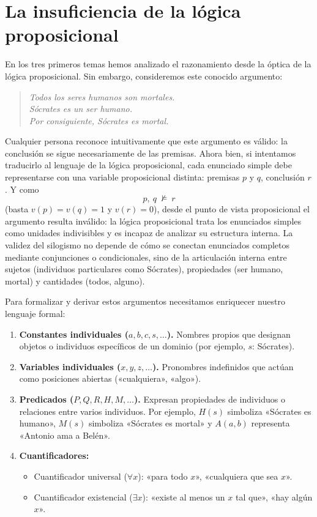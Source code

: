 \section{La insuficiencia de la lógica proposicional}

En los tres primeros temas hemos analizado el razonamiento desde la óptica de la lógica proposicional. Sin embargo, consideremos este conocido argumento:
\begin{quote}
\textit{Todos los seres humanos son mortales.}\\
\textit{Sócrates es un ser humano.}\\
\textit{Por consiguiente, Sócrates es mortal.}
\end{quote}
Cualquier persona reconoce intuitivamente que este argumento es válido: la conclusión se sigue necesariamente de las premisas. Ahora bien, si intentamos traducirlo al lenguaje de la lógica proposicional, cada enunciado simple debe representarse con una variable proposicional distinta: premisas $p$ y $q$, conclusión $r$. Y como
\[
p, \ q \ \not\models \ r
\]
(basta $v(p) = v(q) = 1$ y $v(r) = 0$), desde el punto de vista proposicional el argumento resulta inválido: la lógica proposicional trata los enunciados simples como unidades indivisibles y es incapaz de analizar su estructura interna. La validez del silogismo no depende de cómo se conectan enunciados completos mediante conjunciones o condicionales, sino de la articulación interna entre sujetos (individuos particulares como Sócrates), propiedades (ser humano, mortal) y cantidades (todos, alguno).

Para formalizar y derivar estos argumentos necesitamos enriquecer nuestro lenguaje formal:
\begin{enumerate}
    \item \textbf{Constantes individuales ($a, b, c, s, \dots$).} Nombres propios que designan objetos o individuos específicos de un dominio (por ejemplo, $s$: Sócrates).
    \item \textbf{Variables individuales ($x, y, z, \dots$).} Pronombres indefinidos que actúan como posiciones abiertas («cualquiera», «algo»).
    \item \textbf{Predicados ($P, Q, R, H, M, \dots$).} Expresan propiedades de individuos o relaciones entre varios individuos. Por ejemplo, $H(s)$ simboliza «Sócrates es humano», $M(s)$ simboliza «Sócrates es mortal» y $A(a,b)$ representa «Antonio ama a Belén».
    \item \textbf{Cuantificadores:}
    \begin{itemize}
        \item Cuantificador universal ($\forall x$): «para todo $x$», «cualquiera que sea $x$».
        \item Cuantificador existencial ($\exists x$): «existe al menos un $x$ tal que», «hay algún $x$».
    \end{itemize}
\end{enumerate}

